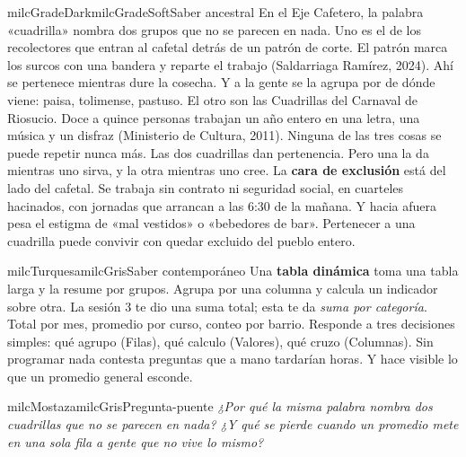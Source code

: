 \documentclass[11pt,letterpaper]{article}
\begin{document}
\begin{softbox}{milcGradeDark}{milcGradeSoft}{Saber ancestral}
En el Eje Cafetero, la palabra «cuadrilla» nombra dos grupos que no se parecen en nada. Uno es el de los recolectores que entran al cafetal detrás de un patrón de corte. El patrón marca los surcos con una bandera y reparte el trabajo (Saldarriaga Ramírez, 2024). Ahí se pertenece mientras dure la cosecha. Y a la gente se la agrupa por de dónde viene: paisa, tolimense, pastuso. El otro son las Cuadrillas del Carnaval de Riosucio. Doce a quince personas trabajan un año entero en una letra, una música y un disfraz (Ministerio de Cultura, 2011). Ninguna de las tres cosas se puede repetir nunca más. Las dos cuadrillas dan pertenencia. Pero una la da mientras uno sirva, y la otra mientras uno cree. La \textbf{cara de exclusión} está del lado del cafetal. Se trabaja sin contrato ni seguridad social, en cuarteles hacinados, con jornadas que arrancan a las 6:30 de la mañana. Y hacia afuera pesa el estigma de «mal vestidos» o «bebedores de bar». Pertenecer a una cuadrilla puede convivir con quedar excluido del pueblo entero.\par{}
\end{softbox}

\begin{softbox}{milcTurquesa}{milcGris}{Saber contemporáneo}
Una \textbf{tabla dinámica} toma una tabla larga y la resume por grupos. Agrupa por una columna y calcula un indicador sobre otra. La sesión 3 te dio una suma total; esta te da \emph{suma por categoría}. Total por mes, promedio por curso, conteo por barrio. Responde a tres decisiones simples: qué agrupo (Filas), qué calculo (Valores), qué cruzo (Columnas). Sin programar nada contesta preguntas que a mano tardarían horas. Y hace visible lo que un promedio general esconde.
\end{softbox}

\begin{softbox}{milcMostaza}{milcGris}{Pregunta-puente}
\textit{¿Por qué la misma palabra nombra dos cuadrillas que no se parecen en nada? ¿Y qué se pierde cuando un promedio mete en una sola fila a gente que no vive lo mismo?}
\end{softbox}
\end{document}
